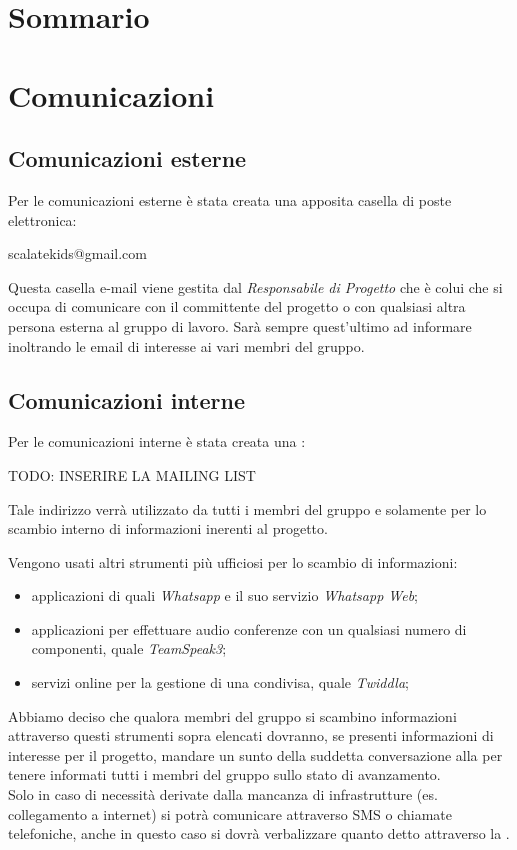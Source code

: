 \documentclass{scalatekids-article}
\begin{document}
\section{Sommario}

\section{Comunicazioni}
\subsection{Comunicazioni esterne}
Per le comunicazioni esterne è stata creata una apposita casella di poste elettronica:
\begin{center}
  scalatekids@gmail.com
\end{center}
Questa casella e-mail viene gestita dal \textit{Responsabile di Progetto} che è colui che si occupa di comunicare con il committente del progetto o con qualsiasi altra persona esterna al gruppo di lavoro. Sarà sempre quest'ultimo ad informare inoltrando le email di interesse ai vari membri del gruppo.

\subsection{Comunicazioni interne}
Per le comunicazioni interne è stata creata una :
\begin{center}
  TODO: INSERIRE LA MAILING LIST
\end{center}
Tale indirizzo verrà utilizzato da tutti i membri del gruppo e solamente per lo scambio interno di informazioni inerenti al progetto.

Vengono usati altri strumenti più ufficiosi per lo scambio di informazioni:
\begin{itemize}
\item applicazioni di  quali \textit{Whatsapp} e il suo servizio \textit{Whatsapp Web};
\item applicazioni  per effettuare audio conferenze con un qualsiasi numero di componenti, quale \textit{TeamSpeak3};
\item servizi online per la gestione di una  condivisa, quale \textit{Twiddla};
\end{itemize}

Abbiamo deciso che qualora membri del gruppo si scambino informazioni attraverso questi strumenti sopra elencati dovranno, se presenti informazioni di interesse per il progetto, mandare un sunto della suddetta conversazione alla  per tenere informati tutti i membri del gruppo sullo stato di avanzamento.\\
Solo in caso di necessità derivate dalla mancanza di infrastrutture (es. collegamento a internet) si potrà comunicare attraverso SMS o chiamate telefoniche, anche in questo caso si dovrà verbalizzare quanto detto attraverso la .
\end{document}
